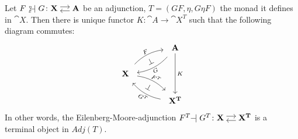 \begin{theorem}
    Let $F {\ }_{\eps}^{\text{\tiny{$\eta$}}}\!\!\!\!\adj G \colon \adjar{X}{A}$ be an adjunction,
    $T = (GF,\eta,G\eta F)$ the monad it defines in $\cat{X}$. Then there is unique functor
    $K \colon \cat{A} \to \cat{X^T}$ such that the following diagram commutes:
    \[
        \begin{tikzcd}[column sep = 4em]
            & \cat{A} \ar[ld,bend left=20,"G"',shorten=2mm,sloped] \ar[dd,"K"] \\
            \cat{X} \ar[ru,bend left = 20,"F",shorten=2mm,sloped,pos=0.48] \ar[rd,bend left = 20,"F^T",shorten=2mm,sloped,pos=0.55]
            \ar[ru,"\bot",phantom,description,sloped] \ar[rd,"\bot",phantom,description,sloped]
            & \\
            & \cat{X^T} \ar[lu,bend left = 20,"G^T"',shorten=2mm,sloped]
        \end{tikzcd}
    \]
    In other words, the Eilenberg-Moore-adjunction $F^T \! \! \adj G^T \colon \adjar{X}{X^T}$ is a terminal object in $Adj(T)$.
\end{theorem}
